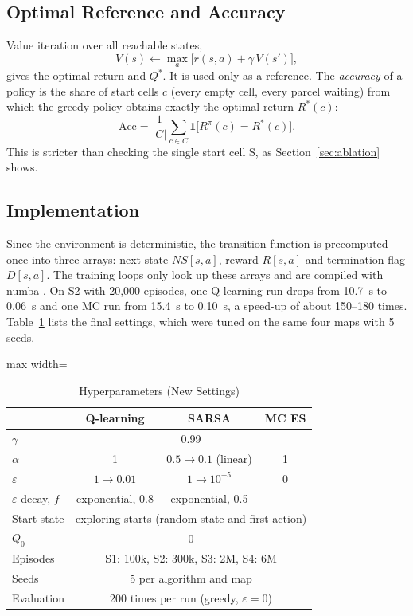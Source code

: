 \documentclass[conference]{IEEEtran}
\newcommand{\Qs}{Q^{*}}
\newcommand{\eps}{\varepsilon}
\begin{document}
\subsection{Optimal Reference and Accuracy}
Value iteration \cite{b8} over all reachable states,
\begin{equation}
V(s)\leftarrow\max_a\big[r(s,a)+\gamma\,V(s')\big],
\end{equation}
gives the optimal return and $\Qs$. It is used only as a reference. The \emph{accuracy} of a policy is the share of start cells $c$ (every empty cell, every parcel waiting) from which the greedy policy obtains exactly the optimal return $R^{*}(c)$:
\begin{equation}
\mathrm{Acc}=\frac{1}{|C|}\sum_{c\in C}\mathbf{1}\big[R^{\pi}(c)=R^{*}(c)\big].
\end{equation}
This is stricter than checking the single start cell S, as Section~\ref{sec:ablation} shows.

\subsection{Implementation}
Since the environment is deterministic, the transition function is precomputed once into three arrays: next state $NS[s,a]$, reward $R[s,a]$ and termination flag $D[s,a]$. The training loops only look up these arrays and are compiled with numba \cite{b6}. On S2 with 20,000 episodes, one Q-learning run drops from 10.7~s to 0.06~s and one MC run from 15.4~s to 0.10~s, a speed-up of about 150--180 times. Table~\ref{tab:hyper} lists the final settings, which were tuned on the same four maps with 5 seeds.

\begin{table}[!t]
\caption{Hyperparameters (New Settings)}
\label{tab:hyper}
\centering
\footnotesize
\begin{adjustbox}{max width=\columnwidth}
\begin{tabular}{|l|c|c|c|}
\hline
 & \textbf{Q-learning} & \textbf{SARSA} & \textbf{MC ES} \\
\hline
$\gamma$ & \multicolumn{3}{c|}{0.99} \\
$\alpha$ & 1 & $0.5\rightarrow0.1$ (linear) & 1 \\
$\eps$ & $1\rightarrow0.01$ & $1\rightarrow10^{-5}$ & 0 \\
$\eps$ decay, $f$ & exponential, 0.8 & exponential, 0.5 & -- \\
Start state & \multicolumn{3}{c|}{exploring starts (random state and first action)} \\
$Q_0$ & \multicolumn{3}{c|}{0} \\
Episodes & \multicolumn{3}{c|}{S1: 100k, S2: 300k, S3: 2M, S4: 6M} \\
Seeds & \multicolumn{3}{c|}{5 per algorithm and map} \\
Evaluation & \multicolumn{3}{c|}{200 times per run (greedy, $\eps=0$)} \\
\hline
\end{tabular}
\end{adjustbox}
\end{table}
\end{document}
